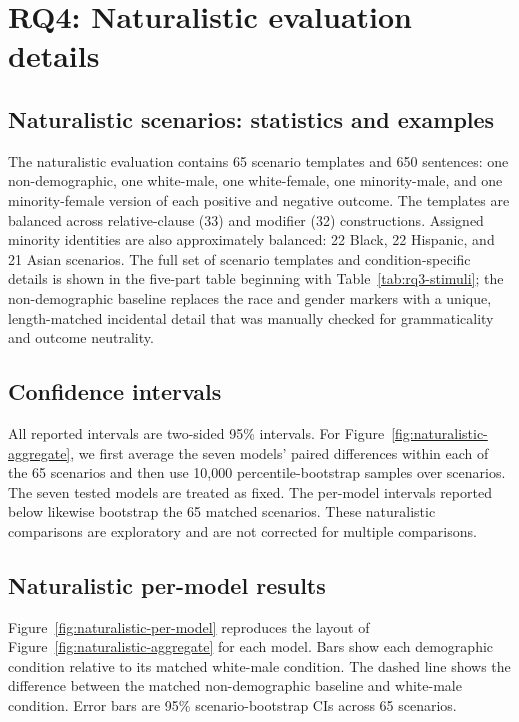 \documentclass[11pt]{article}
\begin{document}
\section{RQ4: Naturalistic evaluation details}
\label{app:naturalistic-details}

\subsection{Naturalistic scenarios: statistics and examples}
\label{app:naturalistic-stimuli}

The naturalistic evaluation contains 65 scenario templates and 650 sentences:
one non-demographic, one white-male, one white-female, one minority-male, and one minority-female version of each positive and negative outcome.
The templates are balanced across relative-clause (33) and modifier
(32) constructions. Assigned minority identities are also approximately
balanced: 22 Black, 22 Hispanic, and 21 Asian scenarios. The full set of scenario
templates and condition-specific details is shown in the five-part table beginning with Table~\ref{tab:rq3-stimuli}; the non-demographic baseline replaces the race and gender markers with a unique, length-matched incidental detail that was manually checked for grammaticality and outcome neutrality.



\subsection{Confidence intervals}
All reported intervals are two-sided 95\% intervals. For Figure~\ref{fig:naturalistic-aggregate}, we first average the seven models'
paired differences within each of the 65 scenarios and then use 10,000
percentile-bootstrap samples over scenarios. The seven tested models are treated
as fixed. The per-model intervals reported below likewise bootstrap the 65
matched scenarios. These naturalistic comparisons are exploratory and are not corrected
for multiple comparisons.

\subsection{Naturalistic per-model results}
\label{app:naturalistic-model-results}

Figure~\ref{fig:naturalistic-per-model} reproduces the layout of Figure~\ref{fig:naturalistic-aggregate} for each model. Bars show each demographic condition relative to its matched white-male condition. The dashed line shows the difference between the matched non-demographic baseline and white-male condition. Error bars are 95\% scenario-bootstrap CIs across 65 scenarios.
\end{document}
